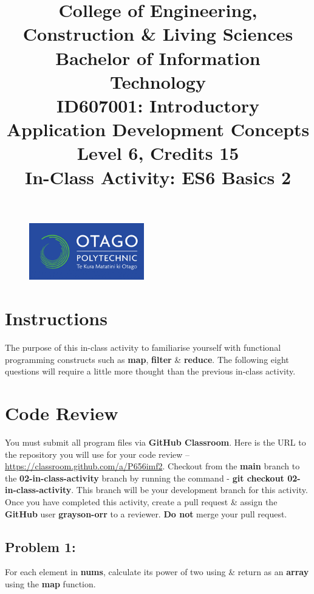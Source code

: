 \documentclass{article}
\author{}
\begin{document}
\begin{figure}
    \centering
    \includegraphics[width=50mm]{../img/logo.png}
\end{figure}

\title{College of Engineering, Construction \& Living Sciences\\Bachelor of Information Technology\\ID607001: Introductory Application Development Concepts\\Level 6, Credits 15\\\textbf{In-Class Activity: ES6 Basics 2}}
\date{}
\maketitle
 
\section*{Instructions}
The purpose of this in-class activity to familiarise yourself with functional programming constructs such as \textbf{map}, \textbf{filter} \& \textbf{reduce}. The following eight questions will require a little more thought than the previous in-class activity.

\section*{Code Review}
You must submit all program files via \textbf{GitHub Classroom}. Here is the URL to the repository you will use for your code review – \href{https://classroom.github.com/a/P656imf2}{https://classroom.github.com/a/P656imf2}. Checkout from the \textbf{main} branch to the \textbf{02-in-class-activity} branch by running the command - \textbf{git checkout 02-in-class-activity}. This branch will be your development branch for this activity. Once you have completed this activity, create a pull request \& assign the \textbf{GitHub} user \textbf{grayson-orr} to a reviewer. \textbf{Do not} merge your pull request.

\subsection*{Problem 1:} 
For each element in \textbf{nums}, calculate its power of two using \& return as an \textbf{array} using the \textbf{map} function. 
\end{document}
